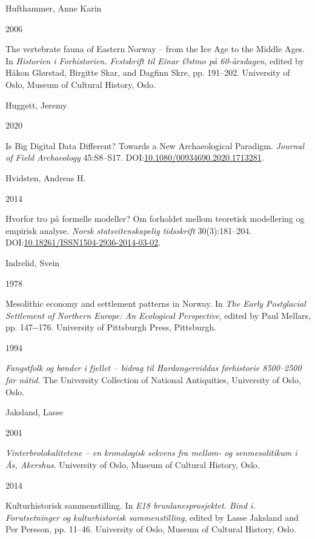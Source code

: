 \documentclass[
  a4paper,
  oneside]{uiophdthesis}
\newlength{\cslhangindent}
\newlength{\csllabelwidth}
\newlength{\cslentryspacingunit} %
\newenvironment{CSLReferences}[2] %
 {%
  \setlength{\parindent}{0pt}
  \ifodd #1
  \let\oldpar\par
  \def\par{\hangindent=\cslhangindent\oldpar}
  \fi
  \setlength{\parskip}{#2\cslentryspacingunit}
 }%
 {}
\newcommand{\CSLBlock}[1]{#1\hfill\break}
\newcommand{\CSLLeftMargin}[1]{\parbox[t]{\csllabelwidth}{#1}}
\newcommand{\CSLRightInline}[1]{\parbox[t]{\linewidth - \csllabelwidth}{#1}\break}
\begin{document}
\begin{CSLReferences}{0}{0}
\leavevmode{}%
\CSLBlock{Hufthammer, Anne Karin}
\CSLLeftMargin{ 2006}
\CSLRightInline{{The vertebrate fauna of Eastern Norway -- from the Ice Age to the Middle Ages}. In \emph{{Historien i Forhistorien. Festskrift til Einar Østmo på 60-årsdagen}}, edited by Håkon Glørstad, Birgitte Skar, and Dagfinn Skre, pp. 191--202. University of Oslo, Museum of Cultural History, Oslo.}

\leavevmode{}%
\CSLBlock{Huggett, Jeremy}
\CSLLeftMargin{ 2020}
\CSLRightInline{{Is Big Digital Data Different? Towards a New Archaeological Paradigm}. \emph{Journal of Field Archaeology} 45:S8--S17. DOI:\href{https://doi.org/10.1080/00934690.2020.1713281}{10.1080/00934690.2020.1713281}.}

\leavevmode{}%
\CSLBlock{Hvidsten, Andreas H.}
\CSLLeftMargin{ 2014}
\CSLRightInline{{Hvorfor tro på formelle modeller? Om forholdet mellom teoretisk modellering og empirisk analyse}. \emph{Norsk statsvitenskapelig tidsskrift} 30(3):181--204. DOI:\href{https://doi.org/10.18261/ISSN1504-2936-2014-03-02}{10.18261/ISSN1504-2936-2014-03-02}.}

\leavevmode{}%
\CSLBlock{Indrelid, Svein}
\CSLLeftMargin{ 1978}
\CSLRightInline{{Mesolithic economy and settlement patterns in Norway}. In \emph{{The Early Postglacial Settlement of Northern Europe: An Ecological Perspective}}, edited by Paul Mellars, pp. 147-\/-176. University of Pittsburgh Press, Pittsburgh.}

\leavevmode{}%
\CSLLeftMargin{ 1994 }
\CSLRightInline{\emph{{Fangstfolk og bønder i fjellet -- bidrag til Hardangerviddas førhistorie 8500--2500 før nåtid}}. The University Collection of National Antiquities, University of Oslo, Oslo.}

\leavevmode{}%
\CSLBlock{Jaksland, Lasse}
\CSLLeftMargin{ 2001}
\CSLRightInline{\emph{{Vinterbrolokalitetene -- en kronologisk sekvens fra mellom- og senmesolitikum i Ås, Akershus}}. University of Oslo, Museum of Cultural History, Oslo.}

\leavevmode{}%
\CSLLeftMargin{ 2014 }
\CSLRightInline{Kulturhistorisk sammenstilling. In \emph{E18 brunlanesprosjektet. Bind i. Forutsetninger og kulturhistorisk sammenstilling}, edited by Lasse Jaksland and Per Persson, pp. 11--46. University of Oslo, Museum of Cultural History, Oslo.}


\end{CSLReferences}
\end{document}
